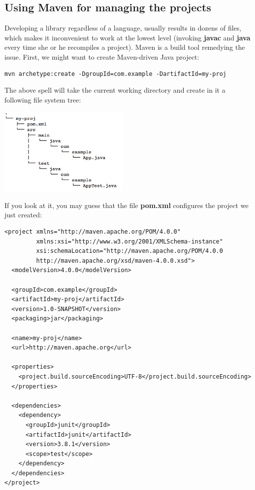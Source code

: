 \documentclass[oneside]{book}
\begin{document}
\subsection{Using Maven for managing the projects}
Developing a library regardless of a language, usually results in dozens of files, which makes it inconvenient to work at the lowest level (invoking \textbf{javac} and \textbf{java} every time she or he recompiles a project). Maven is a build tool remedying the issue. First, we might want to create Maven-driven Java project:
\begin{verbatim}
mvn archetype:create -DgroupId=com.example -DartifactId=my-proj
\end{verbatim}
The above spell will take the current working directory and create in it a following file system tree:
\begin{center}
\includegraphics[width=240px,keepaspectratio]{mvntree}
\end{center}
If you look at it, you may guess that the file \textbf{pom.xml} configures the project we just created:
\begin{lstlisting}
<project xmlns="http://maven.apache.org/POM/4.0.0"
         xmlns:xsi="http://www.w3.org/2001/XMLSchema-instance"
         xsi:schemaLocation="http://maven.apache.org/POM/4.0.0
         http://maven.apache.org/xsd/maven-4.0.0.xsd">
  <modelVersion>4.0.0</modelVersion>

  <groupId>com.example</groupId>
  <artifactId>my-proj</artifactId>
  <version>1.0-SNAPSHOT</version>
  <packaging>jar</packaging>

  <name>my-proj</name>
  <url>http://maven.apache.org</url>

  <properties>
    <project.build.sourceEncoding>UTF-8</project.build.sourceEncoding>
  </properties>

  <dependencies>
    <dependency>
      <groupId>junit</groupId>
      <artifactId>junit</artifactId>
      <version>3.8.1</version>
      <scope>test</scope>
    </dependency>
  </dependencies>
</project>
\end{lstlisting}
\end{document}
